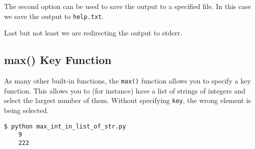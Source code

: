 The second option can be used to save the output to a specified file.
In this case we save the output to \lstinline{help.txt}.

Last but not least we are redirecting the output to stderr.


\subsection{max() Key Function}

As many other built-in functions, the \lstinline{max()} function allows you to specify a key function.
This allows you to (for instance) have a list of strings of integers and select the largest number of them.
Without specifying \lstinline{key}, the wrong element is being selected.



\begin{lstlisting}[caption=Output of max\_int\_in\_list\_of\_str.py]
    $ python max_int_in_list_of_str.py
    9
    222
\end{lstlisting}
